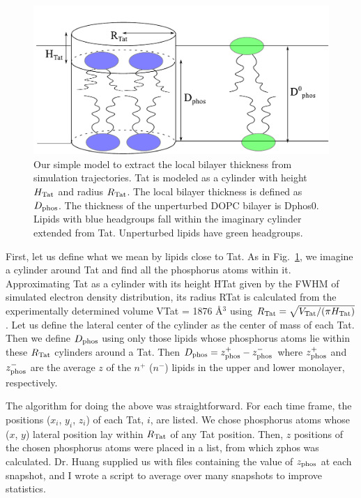 \begin{figure}[htbp]
  \centering
  \includegraphics[scale=0.7]{./figures/Tat/MMs/cylinder_model}
  \caption[Our simple model to extract the local bilayer thickness from 
  simulation trajectories]
  {Our simple model to extract the local bilayer thickness from 
  simulation trajectories. Tat is modeled as a cylinder with height $H_\textrm{Tat}$ 
  and radius $R_\textrm{Tat}$. The local bilayer thickness is defined as $D_\text{phos}$. 
  The thickness of the unperturbed DOPC bilayer is \gls{Dphos0}. 
  Lipids with blue headgroups fall within the imaginary cylinder extended from
  Tat. Unperturbed lipids have green headgroups.}
  \label{fig:cylinder_model}
\end{figure}
 
First, let us define what we mean by lipids close to Tat. As in 
Fig.~\ref{fig:cylinder_model}, we imagine a cylinder around Tat and find all 
the phosphorus atoms within it. Approximating Tat as a cylinder with its height 
\gls{HTat} given by the \acs{FWHM} of simulated electron density distribution, 
its radius \gls{RTat} is calculated from the experimentally determined volume 
\gls{VTat} = 1876 \AA$^3$ using $R_\textrm{Tat}=\sqrt{V_\textrm{Tat}/(\pi H_\textrm{Tat})}$. Let us define 
the lateral center of the cylinder as the center of mass of each
Tat. Then we define $D_\text{phos}$ using only those lipids whose 
phosphorus atoms lie within these $R_\textrm{Tat}$ cylinders around a Tat. 
Then $D_\text{phos}= z_\textrm{phos}^+ - z_\textrm{phos}^-$ where $z_\textrm{phos}^+$ and $z_\textrm{phos}^-$ are the 
average $z$ of the $n^+$ ($n^-$) lipids in the upper and lower monolayer, 
respectively.  

The algorithm for doing the above was straightforward.  
For each time frame, the positions ($x_i$, $y_i$, $z_i$) of each Tat, $i$, are 
listed.   
We chose phosphorus atoms whose ($x$, $y$) lateral position lay within 
$R_\textrm{Tat}$ of any Tat position. Then, $z$ positions
of the chosen phosphorus atoms were placed in a list, from which
\gls{zphos} was calculated. 
Dr. Huang supplied us with files containing the value of $z_\textrm{phos}$ 
at each snapshot, and I wrote a script to average over many snapshots 
to improve statistics. 

